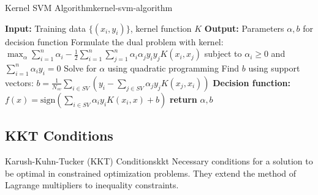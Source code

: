 \documentclass[12pt]{article}
\begin{document}
\begin{algorithmenv}{Kernel SVM Algorithm}{kernel-svm-algorithm}
\begin{algorithmic}[1]
\State \textbf{Input:} Training data $\{(x_i, y_i)\}$, kernel function $K$
\State \textbf{Output:} Parameters $\alpha, b$ for decision function
\State Formulate the dual problem with kernel:
\State $\max_\alpha \sum_{i=1}^n \alpha_i - \frac{1}{2}\sum_{i=1}^n\sum_{j=1}^n \alpha_i \alpha_j y_i y_j K(x_i, x_j)$
\State subject to $\alpha_i \geq 0$ and $\sum_{i=1}^n \alpha_i y_i = 0$
\State Solve for $\alpha$ using quadratic programming
\State Find $b$ using support vectors:
\State $b = \frac{1}{N_{sv}} \sum_{i \in SV} (y_i - \sum_{j \in SV} \alpha_j y_j K(x_j, x_i))$
\State \textbf{Decision function:} $f(x) = \text{sign}(\sum_{i \in SV} \alpha_i y_i K(x_i, x) + b)$
\State \textbf{return} $\alpha, b$
\end{algorithmic}
\end{algorithmenv}

\subsection{KKT Conditions}

\begin{definition}{Karush-Kuhn-Tucker (KKT) Conditions}{kkt}
Necessary conditions for a solution to be optimal in constrained optimization problems. They extend the method of Lagrange multipliers to inequality constraints.
\end{definition}
\end{document}
